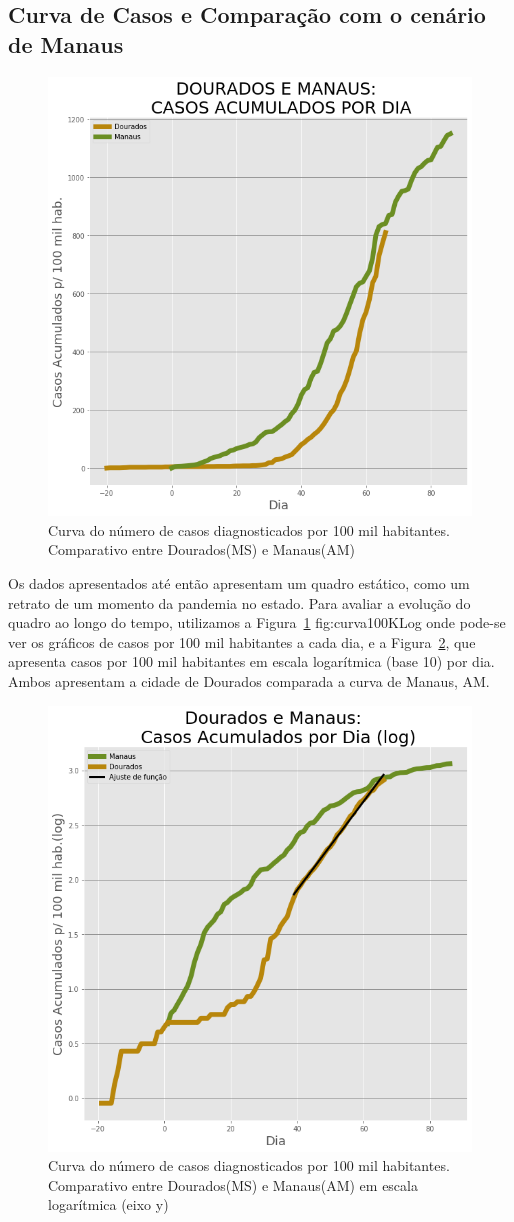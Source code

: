 \documentclass[12pt]{article}
\begin{document}
\subsection{Curva de Casos e Comparação com o cenário de Manaus}\label{ssec:curvaMAU}

\begin{figure}[!htb]
  \centering
  \includegraphics[width=.6\textwidth]{figs/Dourados_Manaus_casos.png}
  \caption{Curva do número de casos diagnosticados por 100 mil habitantes. Comparativo entre Dourados(MS) e Manaus(AM)}
  \label{fig:curva100K}
  \end{figure}

Os dados apresentados até então apresentam um quadro estático, como um retrato de um momento da pandemia no estado. Para avaliar a evolução do quadro ao longo do tempo, utilizamos a Figura~\ref{fig:curva100K} {fig:curva100KLog} onde pode-se ver os gráficos de casos por 100 mil habitantes a cada dia, e a Figura~\ref{fig:curva100KLog}, que apresenta casos por 100 mil habitantes em escala logarítmica (base 10) por dia. Ambos apresentam a cidade de Dourados comparada a curva de Manaus, AM.

\begin{figure}[!htb]
  \centering
  \includegraphics[width=.6\textwidth]{figs/Dourados_Manaus_casos_log.png}
  \caption{Curva do número de casos diagnosticados por 100 mil habitantes. Comparativo entre Dourados(MS) e Manaus(AM) em escala logarítmica (eixo y)}
  \label{fig:curva100KLog}
  \end{figure}
\end{document}
